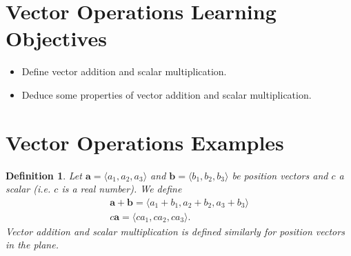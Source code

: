 \documentclass[12pt]{exam}
\newtheorem*{definition}{Definition}
\begin{document}
\section*{Vector Operations Learning Objectives}
  \begin{itemize}
    \item{
      Define vector addition and scalar multiplication.
    }
    \item{
      Deduce some properties of vector addition and scalar multiplication.
    }
  \end{itemize}
  
\section*{Vector Operations Examples}
  \begin{definition}
    Let $\mathbf{a}=\langle a_{1},a_{2},a_{3}\rangle$ and $\mathbf{b}=\langle b_{1},b_{2},b_{3}\rangle$ be position vectors and $c$ a scalar (i.e. $c$ is a real number).
    We define
    \begin{gather*}
      \mathbf{a}+\mathbf{b}=\langle a_{1}+b_{1},a_{2}+b_{2},a_{3}+b_{3}\rangle \\
      c\mathbf{a}=\langle ca_{1},ca_{2},ca_{3}\rangle.
    \end{gather*}
    Vector addition and scalar multiplication is defined similarly for position vectors in the plane.
    \end{definition}
    
\end{document}
